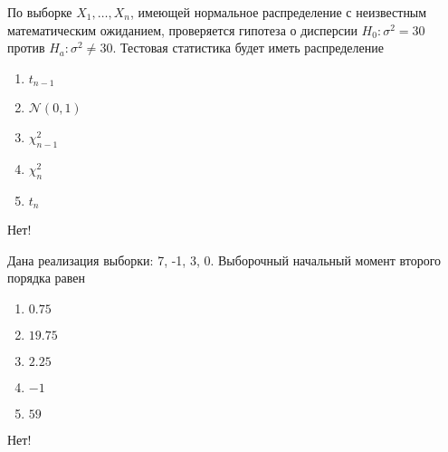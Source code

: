 \documentclass[t]{beamer}
\newcommand{\cN}{\mathcal{N}}
\begin{document}
 \begin{frame} \label{42-No} 
\begin{block}{42} 

По выборке $X_1,\ldots,X_{n}$, имеющей нормальное распределение с неизвестным математическим ожиданием, проверяется гипотеза о дисперсии $H_0: \sigma^2 = 30$ против $H_a: \sigma^2 \ne 30$. Тестовая статистика будет иметь распределение


 \end{block} 
\begin{enumerate} 
\item[] \hyperlink{42-No}{\beamergotobutton{} $t_{n-1}$}
\item[] \hyperlink{42-No}{\beamergotobutton{} $\cN(0,1)$}
\item[] \hyperlink{42-Yes}{\beamergotobutton{} $\chi^2_{n-1}$}
\item[] \hyperlink{42-No}{\beamergotobutton{} $\chi^2_n$}
\item[] \hyperlink{42-No}{\beamergotobutton{} $t_n$}
\end{enumerate} 

 \alert{Нет!} 
\end{frame} 


 \begin{frame} \label{43-No} 
\begin{block}{43} 

Дана реализация выборки: 7, -1, 3, 0. Выборочный начальный момент второго порядка равен


 \end{block} 
\begin{enumerate} 
\item[] \hyperlink{43-No}{\beamergotobutton{} $0.75$}
\item[] \hyperlink{43-Yes}{\beamergotobutton{} $19.75$}
\item[] \hyperlink{43-No}{\beamergotobutton{} $2.25$}
\item[] \hyperlink{43-No}{\beamergotobutton{} $-1$}
\item[] \hyperlink{43-No}{\beamergotobutton{} $59$}
\end{enumerate} 

 \alert{Нет!} 
\end{frame} 
\end{document}
